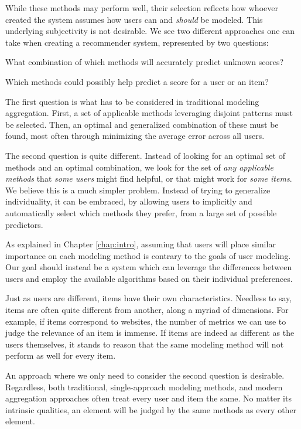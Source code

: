 While these methods may perform well, their selection
reflects how whoever created the system assumes how users
can and \emph{should} be modeled. This underlying subjectivity is not desirable.
We see two different approaches one can take when creating a recommender system,
represented by two questions:

\clearpage

\begin{enumerate*}
  \item What combination of which methods will accurately predict unknown scores?
  \item Which methods could possibly help predict a score for a user or an item?
\end{enumerate*}

The first question is what has to be considered in traditional modeling aggregation.
First, a set of applicable methods leveraging disjoint patterns must be selected. 
Then, an optimal and generalized combination of these must be found,
most often through minimizing the average error across all users.

The second question is quite different. 
Instead of looking for an optimal set of methods and an optimal combination,
we look for the set of \emph{any applicable methods} that \emph{some users} might find helpful,
or that might work for \emph{some items}.
We believe this is a much simpler problem. 
Instead of trying to generalize individuality,
it can be embraced, by allowing users to implicitly and automatically select which methods they prefer,
from a large set of possible predictors.

As explained in Chapter \ref{chap:intro}, 
assuming that users will place similar importance on each modeling method is 
contrary to the goals of user modeling. 
Our goal should instead be a system which can leverage the differences
between users and employ the available algorithms based on their individual preferences.

Just as users are different, items have their own characteristics.
Needless to say, items are often quite different from another,
along a myriad of dimensions. For example,
if items correspond to websites, the number of metrics we can use to judge
the relevance of an item is immense.
If items are indeed as different as the users themselves, it stands to reason that the same 
modeling method will not perform as well for every item.

An approach where we only need to consider the second question is desirable.
Regardless, both traditional, single-approach modeling methods, and modern aggregation approaches
often treat every user and item the same. No matter its intrinsic qualities, an element will be judged
by the same methods as every other element. 

